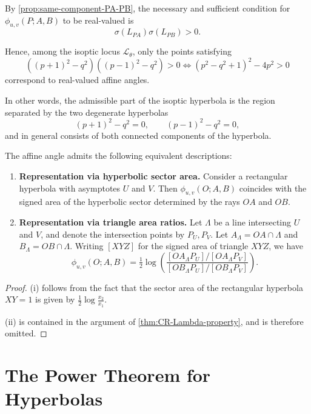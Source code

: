 \documentclass[12pt]{article}
\begin{document}
\begin{remark}
\label{rem:hyperbola-equal-angle}
By \cref{prop:same-component-PA-PB},
the necessary and sufficient condition for $\phi_{u,v}(P;A,B)$
to be real-valued is
\[
\sigma(L_{PA})\sigma(L_{PB})>0.
\]

Hence, among the isoptic locus $\mathcal L_\theta$,
only the points satisfying
\[
((p+1)^2-q^2)((p-1)^2-q^2)>0
\iff
(p^2-q^2+1)^2-4p^2>0
\]
correspond to real-valued affine angles.

In other words, the admissible part of the isoptic hyperbola
is the region separated by the two degenerate hyperbolas
\[
(p+1)^2-q^2=0,\qquad (p-1)^2-q^2=0,
\]
and in general consists of both connected components of the hyperbola.
\end{remark}

\begin{theorem}
The affine angle admits the following equivalent descriptions:
\begin{enumerate}
  \item[(i)] \textbf{Representation via hyperbolic sector area.}  
  Consider a rectangular hyperbola with asymptotes $U$ and $V$.
  Then $\phi_{u,v}(O;A,B)$ coincides with the signed area
  of the hyperbolic sector determined by the rays $OA$ and $OB$.

  \item[(ii)] \textbf{Representation via triangle area ratios.}  
  Let $\Lambda$ be a line intersecting $U$ and $V$,
  and denote the intersection points by $P_U,P_V$.
  Let $A_\Lambda=OA\cap\Lambda$ and $B_\Lambda=OB\cap\Lambda$.
  Writing $[XYZ]$ for the signed area of triangle $XYZ$, we have
  \[
\phi_{u,v}(O;A,B)
=
\tfrac12 \log\!\left(
\frac{[O A_\Lambda P_U]/[O A_\Lambda P_V]}
     {[O B_\Lambda P_U]/[O B_\Lambda P_V]}
\right).
\]
\end{enumerate}
\end{theorem}

\begin{proof}
(i) follows from the fact that the sector area of the rectangular hyperbola
$XY=1$ is given by $\frac{1}{2}\log\frac{x_2}{x_1}$.

(ii) is contained in the argument of
\cref{thm:CR-Lambda-property}, and is therefore omitted.
\end{proof}



\section{The Power Theorem for Hyperbolas}
\end{document}
